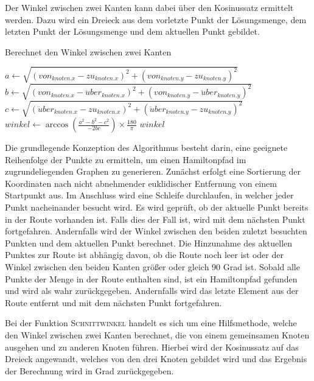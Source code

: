 \documentclass[a4paper,10pt,ngerman]{scrartcl}
\begin{document}
    Der Winkel zwischen zwei Kanten kann dabei über den Kosinussatz ermittelt werden.
    Dazu wird ein Dreieck aus dem vorletzte Punkt der Lösungsmenge, dem letzten Punkt der Lösungsmenge
    und dem aktuellen Punkt gebildet.

    \begin{algorithm}[H]
        \caption{Berechnet den Winkel zwischen zwei Kanten}
        \begin{algorithmic}
                \State $\textit{a}\gets \sqrt{(von_{knoten.x} - zu_{knoten.x})^2 + (von_{knoten.y} - zu_{knoten.y})^2}$
                \State $\textit{b}\gets \sqrt{(von_{knoten.x} - \ddot uber_{knoten.x})^2 + (von_{knoten.y} - \ddot uber_{knoten.y})^2}$
                \State $\textit{c}\gets \sqrt{(\ddot uber_{knoten.x} - zu_{knoten.x})^2 + (\ddot uber_{knoten.y} - zu_{knoten.y})^2}$
                \State $\textit{winkel} \gets \arccos\left(\frac{a^2 - b^2 - c^2}{-2bc}\right) \times \frac{180}{\pi}$
                \State \Return $winkel$
            \EndFunction
        \end{algorithmic}\label{alg:pseudo_crossangle}
    \end{algorithm}

    Die grundlegende Konzeption des Algorithmus besteht darin, eine geeignete Reihenfolge der Punkte zu ermitteln,
    um einen Hamiltonpfad im zugrundeliegenden Graphen zu generieren.
    Zunächst erfolgt eine Sortierung der Koordinaten nach nicht abnehmender euklidischer Entfernung von einem Startpunkt aus.
    Im Anschluss wird eine Schleife durchlaufen, in welcher jeder Punkt nacheinander besucht wird.
    Es wird geprüft, ob der aktuelle Punkt bereits in der Route vorhanden ist.
    Falls dies der Fall ist, wird mit dem nächsten Punkt fortgefahren.
    Andernfalls wird der Winkel zwischen den beiden zuletzt besuchten Punkten und dem aktuellen Punkt berechnet.
    Die Hinzunahme des aktuellen Punktes zur Route ist abhängig davon,
    ob die Route noch leer ist oder der Winkel zwischen den beiden Kanten größer oder gleich 90 Grad ist.
    Sobald alle Punkte der Menge in der Route enthalten sind, ist ein Hamiltonpfad gefunden und wird als wahr zurückgegeben.
    Andernfalls wird das letzte Element aus der Route entfernt und mit dem nächsten Punkt fortgefahren.

    Bei der Funktion \textsc{Schnittwinkel} handelt es sich um eine Hilfsmethode, welche den Winkel zwischen zwei Kanten berechnet,
    die von einem gemeinsamen Knoten ausgehen und zu anderen Knoten führen.
    Hierbei wird der Kosinussatz auf das Dreieck angewandt, welches von den drei Knoten gebildet wird
    und das Ergebnis der Berechnung wird in Grad zurückgegeben.
\end{document}
